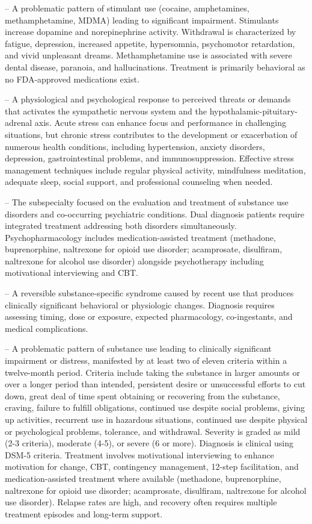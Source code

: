 -- A problematic pattern of stimulant use (cocaine, amphetamines, methamphetamine, MDMA) leading to significant impairment. Stimulants increase dopamine and norepinephrine activity. Withdrawal is characterized by fatigue, depression, increased appetite, hypersomnia, psychomotor retardation, and vivid unpleasant dreams. Methamphetamine use is associated with severe dental disease, paranoia, and hallucinations. Treatment is primarily behavioral as no FDA-approved medications exist.

-- A physiological and psychological response to perceived threats or demands that activates the sympathetic nervous system and the hypothalamic-pituitary-adrenal axis. Acute stress can enhance focus and performance in challenging situations, but chronic stress contributes to the development or exacerbation of numerous health conditions, including hypertension, anxiety disorders, depression, gastrointestinal problems, and immunosuppression. Effective stress management techniques include regular physical activity, mindfulness meditation, adequate sleep, social support, and professional counseling when needed.

-- The subspecialty focused on the evaluation and treatment of substance use disorders and co-occurring psychiatric conditions. Dual diagnosis patients require integrated treatment addressing both disorders simultaneously. Psychopharmacology includes medication-assisted treatment (methadone, buprenorphine, naltrexone for opioid use disorder; acamprosate, disulfiram, naltrexone for alcohol use disorder) alongside psychotherapy including motivational interviewing and CBT.

-- A reversible substance-specific syndrome caused by recent use that produces clinically significant behavioral or physiologic changes. Diagnosis requires assessing timing, dose or exposure, expected pharmacology, co-ingestants, and medical complications.

-- A problematic pattern of substance use leading to clinically significant impairment or distress, manifested by at least two of eleven criteria within a twelve-month period. Criteria include taking the substance in larger amounts or over a longer period than intended, persistent desire or unsuccessful efforts to cut down, great deal of time spent obtaining or recovering from the substance, craving, failure to fulfill obligations, continued use despite social problems, giving up activities, recurrent use in hazardous situations, continued use despite physical or psychological problems, tolerance, and withdrawal. Severity is graded as mild (2-3 criteria), moderate (4-5), or severe (6 or more). Diagnosis is clinical using DSM-5 criteria. Treatment involves motivational interviewing to enhance motivation for change, CBT, contingency management, 12-step facilitation, and medication-assisted treatment where available (methadone, buprenorphine, naltrexone for opioid use disorder; acamprosate, disulfiram, naltrexone for alcohol use disorder). Relapse rates are high, and recovery often requires multiple treatment episodes and long-term support.

